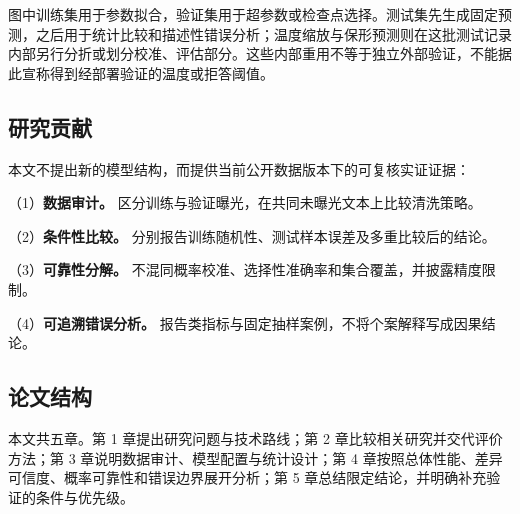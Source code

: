 图中训练集用于参数拟合，验证集用于超参数或检查点选择。测试集先生成固定预测，之后用于统计比较和描述性错误分析；温度缩放与保形预测则在这批测试记录内部另行分折或划分校准、评估部分。这些内部重用不等于独立外部验证，不能据此宣称得到经部署验证的温度或拒答阈值。

\FloatBarrier\subsection{研究贡献}

本文不提出新的模型结构，而提供当前公开数据版本下的可复核实证证据：

（1）\textbf{数据审计。} 区分训练与验证曝光，在共同未曝光文本上比较清洗策略。

（2）\textbf{条件性比较。} 分别报告训练随机性、测试样本误差及多重比较后的结论。

（3）\textbf{可靠性分解。} 不混同概率校准、选择性准确率和集合覆盖，并披露精度限制。

（4）\textbf{可追溯错误分析。} 报告类指标与固定抽样案例，不将个案解释写成因果结论。

\FloatBarrier\subsection{论文结构}

本文共五章。第 1 章提出研究问题与技术路线；第 2 章比较相关研究并交代评价方法；第 3 章说明数据审计、模型配置与统计设计；第 4 章按照总体性能、差异可信度、概率可靠性和错误边界展开分析；第 5 章总结限定结论，并明确补充验证的条件与优先级。
